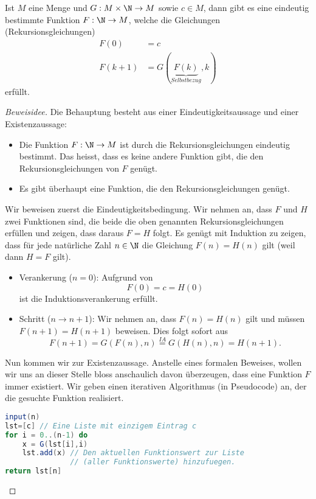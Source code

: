 \begin{theorem}\label{thrm:rekursive definitionen}
 Ist $M$ eine Menge und $G:M\times\N\rightarrow M$ sowie $c\in M$, dann gibt es eine eindeutig bestimmte Funktion $F:\N\rightarrow M$, welche die Gleichungen (Rekursionsgleichungen)
\begin{align*}
 F(0)&=c\\
F(k+1)&=G(\underbrace{F(k)}_{Selbstbezug},k)
\end{align*}
erfüllt.
\end{theorem}
\begin{proof}[Beweisidee]
Die Behauptung besteht aus einer Eindeutigkeitsaussage und einer Existenzaussage:
\begin{itemize}
\item Die Funktion $F:\N\to M$ ist durch die Rekursionsgleichungen eindeutig bestimmt. Das heisst, dass es keine andere  Funktion gibt, die den Rekursionsgleichungen von $F$ genügt.
\item Es gibt überhaupt eine Funktion, die den Rekursionsgleichungen genügt.
\end{itemize}
Wir beweisen zuerst die Eindeutigkeitsbedingung. Wir nehmen an, dass $F$ und $H$ zwei Funktionen sind, die beide die oben genannten Rekursionsgleichungen erfüllen und zeigen, dass daraus $F=H$ folgt. Es genügt mit Induktion zu zeigen, dass für jede natürliche Zahl $n\in \N$ die Gleichung $F(n)=H(n)$ gilt (weil dann $H=F$ gilt).
\begin{itemize}
\item Verankerung ($n=0$): Aufgrund von
\[
F(0)=c=H(0)
\]
ist die Induktionsverankerung erfüllt.
\item Schritt ($n\to n+1$): Wir nehmen an, dass $F(n)=H(n)$ gilt und müssen $F(n+1)=H(n+1)$ beweisen. Dies folgt sofort aus
\[
F(n+1)=G(F(n),n)\stackrel{IA}{=}G(H(n),n)=H(n+1).
\]
\end{itemize}
Nun kommen wir zur Existenzaussage. Anstelle eines formalen Beweises, wollen wir uns an dieser Stelle bloss anschaulich davon überzeugen, dass eine Funktion $F$ immer existiert. Wir geben einen iterativen Algorithmus (in Pseudocode) an, der die gesuchte Funktion realisiert.
\begin{framed}
\begin{lstlisting}[language=Java]
input(n)
lst=[c] // Eine Liste mit einzigem Eintrag c
for i = 0..(n-1) do
    x = G(lst[i],i)
    lst.add(x) // Den aktuellen Funktionswert zur Liste
               // (aller Funktionswerte) hinzufuegen.
return lst[n]
\end{lstlisting}
\end{framed}\qedhere
\end{proof}
